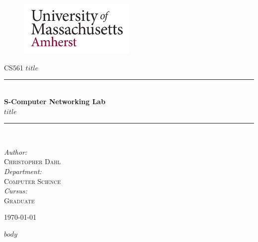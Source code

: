 \documentclass{article}
\begin{document}

\addtocounter{cptfigure}{1}
\newcommand{\HRule}{\rule{\linewidth}{0.5mm}}

\providecommand{\tightlist}{%
  \setlength{\itemsep}{0pt}\setlength{\parskip}{0pt}}

\begin{titlepage}
\begin{center}

\begin{figure}[!h]{}
\includegraphics[width=0.5\textwidth]{images/UMASS.png}
\end{figure}
\vspace{2cm}
\textsc{\Large{CS561 $title$}}\\[2cm]


\color{red umass}
\HRule \\[0.4cm]

{\huge \bfseries S-Computer Networking Lab \\ $title$ \\[0.4cm] }

\HRule \\[1cm]
\color{black}

\begin{center} \large
\emph{Author:}\\
\textsc{Christopher Dahl}\\
\vspace{3mm}
\emph{Department:}\\
\textsc{Computer Science}\\
\vspace{3mm}
\emph{Cursus:}\\
\textsc{Graduate}\\
\end{center}

\vfill
{\large \today}

\end{center}
\end{titlepage}

\thispagestyle{empty}
\newpage
\thispagestyle{empty}
\setcounter{page}{0}
\renewcommand{\arraystretch}{1.5}

\thispagestyle{empty}
\setcounter{page}{0}

$body$


\end{document}
